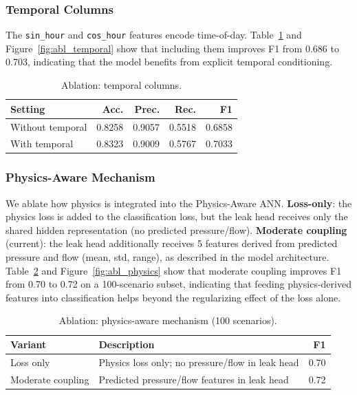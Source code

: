 \documentclass[final,5p,times,twocolumn,authoryear]{elsarticle}
\begin{document}
\subsubsection{Temporal Columns}

The \texttt{sin\_hour} and \texttt{cos\_hour} features encode time-of-day. Table~\ref{tab:abl_temporal} and Figure~\ref{fig:abl_temporal} show that including them improves F1 from 0.686 to 0.703, indicating that the model benefits from explicit temporal conditioning.

\begin{table}[H]
\centering
\caption{Ablation: temporal columns.}
\label{tab:abl_temporal}
\small
\begin{tabular}{@{}lrrrr@{}}
\toprule
\textbf{Setting} & \textbf{Acc.} & \textbf{Prec.} & \textbf{Rec.} & \textbf{F1} \\ \midrule
Without temporal & 0.8258 & 0.9057 & 0.5518 & 0.6858 \\
With temporal    & 0.8323 & 0.9009 & 0.5767 & 0.7033 \\ \bottomrule
\end{tabular}
\end{table}

\subsubsection{Physics-Aware Mechanism}

We ablate how physics is integrated into the Physics-Aware ANN. \textbf{Loss-only}: the physics loss is added to the classification loss, but the leak head receives only the shared hidden representation (no predicted pressure/flow). \textbf{Moderate coupling} (current): the leak head additionally receives 5 features derived from predicted pressure and flow (mean, std, range), as described in the model architecture. Table~\ref{tab:abl_physics} and Figure~\ref{fig:abl_physics} show that moderate coupling improves F1 from 0.70 to 0.72 on a 100-scenario subset, indicating that feeding physics-derived features into classification helps beyond the regularizing effect of the loss alone.

\begin{table}[H]
\centering
\caption{Ablation: physics-aware mechanism (100 scenarios).}
\label{tab:abl_physics}
\small
\begin{tabular}{@{}llr@{}}
\toprule
\textbf{Variant} & \textbf{Description} & \textbf{F1} \\ \midrule
Loss only & Physics loss only; no pressure/flow in leak head & 0.70 \\
Moderate coupling & Predicted pressure/flow features in leak head & 0.72 \\ \bottomrule
\end{tabular}
\end{table}

%


\end{document}
